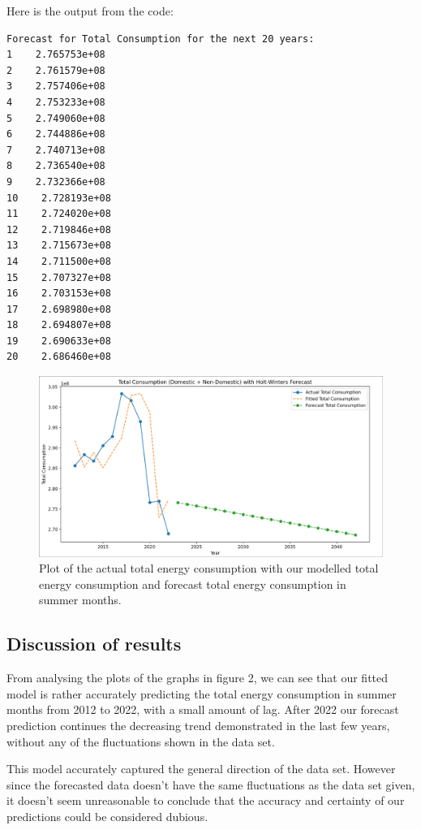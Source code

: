 \documentclass[11pt]{article}
\begin{document}
Here is the output from the code:

\begin{verbatim}
Forecast for Total Consumption for the next 20 years:
1    2.765753e+08
2    2.761579e+08
3    2.757406e+08
4    2.753233e+08
5    2.749060e+08
6    2.744886e+08
7    2.740713e+08
8    2.736540e+08
9    2.732366e+08
10    2.728193e+08
11    2.724020e+08
12    2.719846e+08
13    2.715673e+08
14    2.711500e+08
15    2.707327e+08
16    2.703153e+08
17    2.698980e+08
18    2.694807e+08
19    2.690633e+08
20    2.686460e+08
\end{verbatim}

\begin{center}
\begin{figure}[H]
  \centering
  \includegraphics[scale=0.25]{Images/Q2.png}
  \caption{Plot of the actual total energy consumption with our modelled total energy consumption and forecast total energy
  consumption in summer months.}
\end{figure}
\end{center}

\subsection{Discussion of results}

From analysing the plots of the graphs in figure 2, we can see that our fitted model is rather accurately predicting the
total energy consumption in summer months from 2012 to 2022, with a small amount of lag. After 2022 our forecast prediction
continues the decreasing trend demonstrated in the last few years, without any of the fluctuations shown in the data set.

This model accurately captured the general direction of the data set. However since the forecasted data doesn't have the same
fluctuations as the data set given, it doesn't seem unreasonable to conclude that the accuracy and certainty of our
predictions could be considered dubious.
\end{document}
